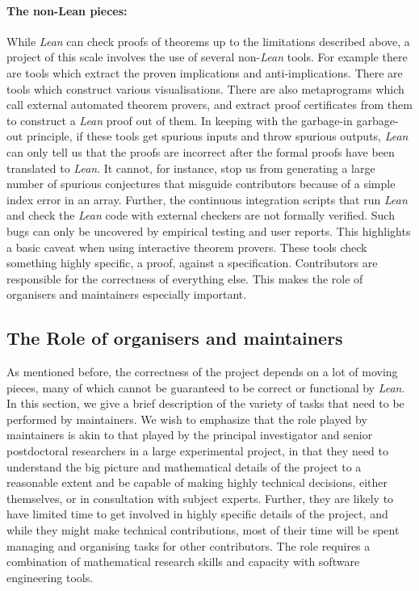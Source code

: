 \paragraph{\textbf{The non-Lean pieces:}} While \emph{Lean} can check proofs of theorems up to the limitations described above, a project of this scale involves the use of several non-\emph{Lean} tools. For example there are tools which extract the proven implications and anti-implications. There are tools which construct various visualisations. There are also metaprograms which call external automated theorem provers, and extract proof certificates from them to construct a \emph{Lean} proof out of them. In keeping with the garbage-in garbage-out principle, if these tools get spurious inputs and throw spurious outputs, \emph{Lean} can only tell us that the proofs are incorrect after the formal proofs have been translated to \emph{Lean}. It cannot, for instance, stop us from generating a large number of spurious conjectures that misguide contributors because of a simple index error in an array. Further, the continuous integration scripts that run \emph{Lean} and check the \emph{Lean} code with external checkers are not formally verified. Such bugs can only be uncovered by empirical testing and user reports. This highlights a basic caveat when using interactive theorem provers. These tools check something highly specific, a proof, against a specification. Contributors are responsible for the correctness of everything else. This makes the role of organisers and maintainers especially important.

\subsection{The Role of organisers and maintainers}
As mentioned before, the correctness of the project depends on a lot of moving pieces, many of which cannot be guaranteed to be correct or functional by \emph{Lean}. In this section, we give a brief description of the variety of tasks that need to be performed by maintainers. We wish to emphasize that the role played by maintainers is akin to that played by the principal investigator and senior postdoctoral researchers in a large experimental project, in that they need to understand the big picture and mathematical details of the project to a reasonable extent and be capable of making highly technical decisions, either themselves, or in consultation with subject experts. Further, they are likely to have limited time to get involved in highly specific details of the project, and while they might make technical contributions, most of their time will be spent managing and organising tasks for other contributors. The role requires a  combination of mathematical research skills and capacity with software engineering tools.

